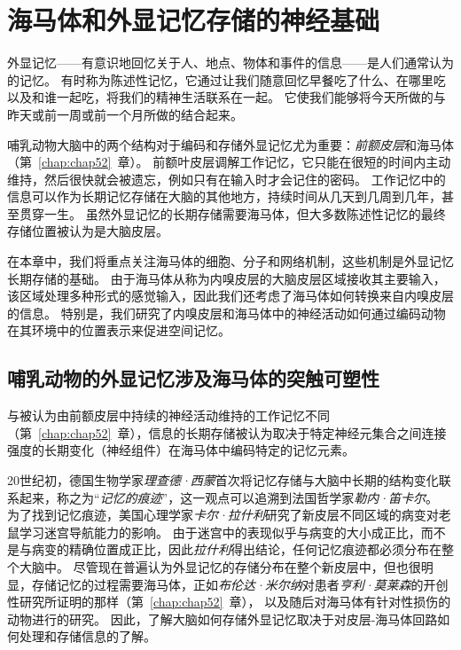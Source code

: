 \chapter{海马体和外显记忆存储的神经基础} \label{chap:chap54}

外显记忆——有意识地回忆关于人、地点、物体和事件的信息——是人们通常认为的记忆。
有时称为陈述性记忆，它通过让我们随意回忆早餐吃了什么、在哪里吃以及和谁一起吃，将我们的精神生活联系在一起。
它使我们能够将今天所做的与昨天或前一周或前一个月所做的结合起来。


哺乳动物大脑中的两个结构对于编码和存储外显记忆尤为重要：\textit{前额皮层}和海马体（第~\ref{chap:chap52}~章）。
前额叶皮层调解工作记忆，它只能在很短的时间内主动维持，然后很快就会被遗忘，例如只有在输入时才会记住的密码。
工作记忆中的信息可以作为长期记忆存储在大脑的其他地方，持续时间从几天到几周到几年，甚至贯穿一生。
虽然外显记忆的长期存储需要海马体，但大多数陈述性记忆的最终存储位置被认为是大脑皮层。


在本章中，我们将重点关注海马体的细胞、分子和网络机制，这些机制是外显记忆长期存储的基础。
由于海马体从称为内嗅皮层的大脑皮层区域接收其主要输入，该区域处理多种形式的感觉输入，因此我们还考虑了海马体如何转换来自内嗅皮层的信息。
特别是，我们研究了内嗅皮层和海马体中的神经活动如何通过编码动物在其环境中的位置表示来促进空间记忆。



\section{哺乳动物的外显记忆涉及海马体的突触可塑性}

与被认为由前额皮层中持续的神经活动维持的工作记忆不同（第~\ref{chap:chap52}~章），信息的长期存储被认为取决于特定神经元集合之间连接强度的长期变化（神经组件）在海马体中编码特定的记忆元素。


20世纪初，德国生物学家\textit{理查德·西蒙}首次将记忆存储与大脑中长期的结构变化联系起来，称之为“\textit{记忆的痕迹}”，这一观点可以追溯到法国哲学家\textit{勒内·笛卡尔}。
为了找到记忆痕迹，美国心理学家\textit{卡尔·拉什利}研究了新皮层不同区域的病变对老鼠学习迷宫导航能力的影响。
由于迷宫中的表现似乎与病变的大小成正比，而不是与病变的精确位置成正比，因此\textit{拉什利}得出结论，任何记忆痕迹都必须分布在整个大脑中。
尽管现在普遍认为外显记忆的存储分布在整个新皮层中，但也很明显，存储记忆的过程需要海马体，正如\textit{布伦达·米尔纳}对患者\textit{亨利·莫莱森}的开创性研究所证明的那样（第~\ref{chap:chap52}~章），
以及随后对海马体有针对性损伤的动物进行的研究。
因此，了解大脑如何存储外显记忆取决于对皮层-海马体回路如何处理和存储信息的了解。


